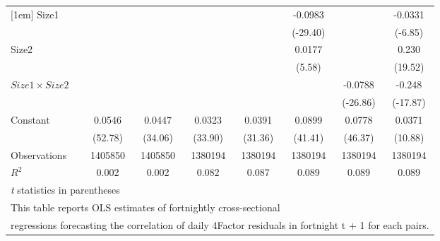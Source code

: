 {\begin{tabular}{l*{7}{c}}
[1em]
Size1               &                     &                     &                     &                     &     -0.0983\sym{***}&                     &     -0.0331\sym{***}\\
                    &                     &                     &                     &                     &    (-29.40)         &                     &     (-6.85)         \\
[1em]
Size2               &                     &                     &                     &                     &      0.0177\sym{***}&                     &       0.230\sym{***}\\
                    &                     &                     &                     &                     &      (5.58)         &                     &     (19.52)         \\
[1em]
$ Size1 \times Size2 $&                     &                     &                     &                     &                     &     -0.0788\sym{***}&      -0.248\sym{***}\\
                    &                     &                     &                     &                     &                     &    (-26.86)         &    (-17.87)         \\
[1em]
Constant            &      0.0546\sym{***}&      0.0447\sym{***}&      0.0323\sym{***}&      0.0391\sym{***}&      0.0899\sym{***}&      0.0778\sym{***}&      0.0371\sym{***}\\
                    &     (52.78)         &     (34.06)         &     (33.90)         &     (31.36)         &     (41.41)         &     (46.37)         &     (10.88)         \\
\hline
Observations        &     1405850         &     1405850         &     1380194         &     1380194         &     1380194         &     1380194         &     1380194         \\
\(R^{2}\)           &       0.002         &       0.002         &       0.082         &       0.087         &       0.089         &       0.089         &       0.089         \\
\hline\hline
\multicolumn{8}{l}{\footnotesize \textit{t} statistics in parentheses}\\
\multicolumn{8}{l}{\footnotesize This table reports OLS estimates of fortnightly cross-sectional}\\
\multicolumn{8}{l}{\footnotesize  regressions forecasting the correlation of daily 4Factor residuals in fortnight t + 1 for each pairs.}\\

\end{tabular}}

